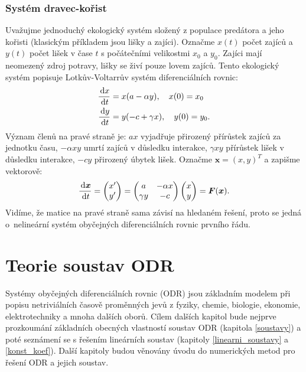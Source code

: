 \documentclass[a4paper, 12pt]{book}
\theoremstyle{definition}
\def\d{\,{\rm d}}               %
\def\vc#1{\mathbf{\boldsymbol{#1}}}     %
\begin{document}
\subsection{Systém dravec-kořist}
Uvažujme jednoduchý ekologický systém složený z populace predátora  a jeho kořisti (klasickým příkladem jsou lišky a zajíci).
Označme $x(t)$ počet zajíců a $y(t)$ počet lišek v čase $t$ s počátečními velikostmi $x_0$ a $y_0$. 
Zajíci mají neomezený zdroj potravy, lišky se živí pouze lovem zajíců.
Tento ekologický systém popisuje Lotkův-Voltarrův systém diferenciálních rovnic:
\begin{align}
  \frac{\d x}{\d t} &= x(a-\alpha y), \quad x(0)=x_0\\
  \frac{\d y}{\d t} &= y(-c+\gamma x), \quad y(0)=y_0.
\end{align}
Význam členů na pravé straně je: $ax$ vyjadřuje přirozený přírůstek zajíců za jednotku času, $-\alpha xy$ umrtí zajíců v důsledku interakce,
$\gamma x y$ přírůstek lišek v důsledku interakce, $-cy$ přirozený úbytek lišek.
Označme $\vc x = (x,y)^T$ a zapišme vektorově:
\[
   \frac{\d \vc x}{\d t} = \begin{pmatrix} x'\\ y' \end{pmatrix}
   = \begin{pmatrix} a & -\alpha x \\ \gamma y & - c\end{pmatrix} 
     \begin{pmatrix} x \\ y\end{pmatrix} = \vc F(\vc x).
\]
Vidíme, že matice na pravé straně sama závisí na hledaném řešení, proto se jedná o~nelineární systém obyčejných diferenciálních rovnic prvního řádu.



\chapter{Teorie soustav ODR}
Systémy obyčejných diferenciálních rovnic (ODR) jsou základním modelem při popisu netriviálních 
časově proměnných jevů z fyziky, chemie, biologie, ekonomie, elektrotechniky a mnoha dalších oborů. 
Cílem dalších kapitol bude nejprve prozkoumání základních obecných vlastností soustav ODR (kapitola \ref{soustavy})
a poté seznámení se s řešením lineárních soustav (kapitoly \ref{linearni_soustavy} a \ref{konst_koef}). Další kapitoly budou věnovány 
úvodu do numerických metod pro řešení ODR a jejich soustav.
\end{document}
